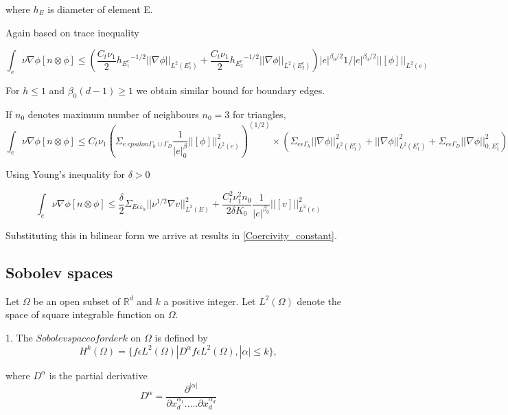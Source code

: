 \documentclass[a4paper,10pt]{book}
\begin{document}
where $h_E$ is diameter of element E.

Again based on trace inequality

\begin{equation}
\int_e {\nu \nabla \phi}[n \otimes \phi] \leq (\frac{C_t \nu_1}{2} {h_{E_1^e}}^{-1/2} ||\nabla \phi||_{L^2(E_1^e)} + \frac{C_t \nu_1}{2} {h_{E_2^e}}^{-1/2} ||\nabla \phi||_{L^2(E_2^e)}) |e|^{\beta_0/2} {1/|e|}^{\beta_0/2} ||[\phi]||_{L^2(e)}
\end{equation}

For $h \leq 1$ and $\beta_0 (d-1) \geq 1$ we obtain similar bound for boundary edges.

If $n_0$ denotes maximum number of neighbours $n_0 = 3$ for triangles,
\begin{equation}
\int_e {\nu \nabla \phi}[n \otimes \phi] \leq C_t \nu_1 (\Sigma_{e \ epsilon \Gamma_h \cup \Gamma_D} \frac{1}{|e|^\beta_0} ||[\phi]||^2_{L^2(e)})^(1/2) \times (\Sigma_{e \epsilon \Gamma_h} ||\nabla \phi||^2_{L^2(E_1^e)} + ||\nabla \phi||^2_{L^2(E_1^e)} + \Sigma_{e \epsilon \Gamma_D} ||\nabla \phi||^2_{0,E_1^e})
\end{equation}

Using Young's inequality for $\delta > 0$

\begin{equation}
\int_e {\nu \nabla \phi}[n \otimes \phi] \leq \frac{\delta}{2} \Sigma_{E \epsilon \varepsilon_h} ||\nu^{1/2} \nabla v ||^2_{L^2(E)} +  \frac{C_t^2 \nu_1^2 n_0}{2 \delta K_0} \frac{1}{|e|^{\beta_0}} ||[v]||^2_{L^2(e)}
\end{equation}


Substituting this in bilinear form we arrive at results in \ref{Coercivity_constant}.

\subsection{Sobolev spaces} \cite{crbm}

Let $\Omega$ be an open subset of $\mathbb{R}^d$ and $k$ a positive integer. Let $L^2(\Omega)$ denote the space of square integrable function on $\Omega$. 

1. The $Sobolev space of order k$ on $\Omega$ is defined by\\
\begin{equation}
H^k (\Omega) = \lbrace f \epsilon L^2 (\Omega) | D^\alpha f \epsilon L^2 (\Omega), |\alpha| \leq k \rbrace ,
\end{equation} 

where $D^\alpha$ is the partial derivative
\begin{equation}
D^\alpha = \frac{\partial^{|\alpha|}}{\partial x_d^{\alpha_1} ..... \partial x_d^{\alpha_d}}
\end{equation}
\end{document}
